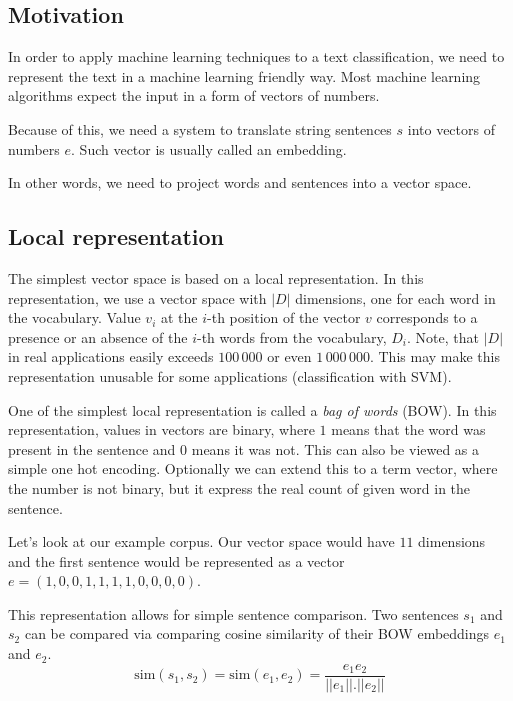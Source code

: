         \subsection{Motivation}
        In order to apply machine learning techniques to a text classification, 
        we need to represent the text in a machine learning friendly way.
        Most machine learning algorithms expect the input in a form of vectors of numbers. 
        
        Because of this, we need a system to translate string sentences $s$ into vectors of numbers $e$.
        Such vector is usually called an embedding. 
        
        In  other words, we need to project words and sentences into a vector space.
        
        \subsection{Local representation}
        
        The simplest vector space is based on a local representation.
        In this representation, we use a vector space with $|D|$ dimensions, one for each word in the vocabulary.
        Value $v_i$ at the $i$-th position of the vector $v$ corresponds to a presence or an absence of the $i$-th words from the vocabulary, $D_i$.
        Note, that $|D|$ in real applications easily exceeds $100\,000$ or even $1\,000\,000$.
        This may make this representation unusable for some applications (classification with SVM).
        
        One of the simplest local representation is called a \textit{bag of words} (BOW). 
        In this representation, values in vectors are binary, where $1$ means that the word was present in the sentence and $0$ means it was not.
        This can also be viewed as a simple one hot encoding.
        Optionally we can extend this to a term vector, where the number is not binary, but it express the real count of given word in the sentence.
        
        Let's look at our example corpus. 
        Our vector space would have $11$ dimensions and the first sentence would be represented as a vector
        $e = (1, 0, 0, 1, 1, 1, 1, 0, 0, 0, 0)$.
        
        This representation allows for simple sentence comparison. 
        Two sentences $s_1$ and $s_2$ can be compared via comparing cosine similarity of their BOW embeddings $e_1$ and $e_2$.
        $$\mathrm{sim}(s_1, s_2) = \mathrm{sim}(e_1, e_2) = \frac{e_1 e_2}{||e_1||.||e_2||}$$
        
